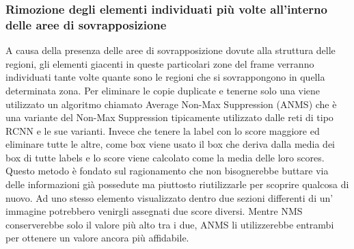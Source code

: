 \subsubsection{Rimozione degli elementi individuati più volte all'interno delle aree di sovrapposizione}
A causa della presenza delle aree di sovrapposizione dovute alla struttura delle regioni, gli elementi giacenti in queste particolari zone del frame verranno individuati tante volte quante sono le regioni che si sovrappongono in quella determinata zona. Per eliminare le copie duplicate e tenerne solo una viene utilizzato un algoritmo chiamato Average Non-Max Suppression (ANMS) che è una variante del Non-Max Suppression tipicamente utilizzato dalle reti di tipo RCNN e le sue varianti. Invece che tenere la label con lo score maggiore ed eliminare tutte le altre, come box viene usato il box che deriva dalla media dei box di tutte labels e lo score viene calcolato come la media delle loro scores.
Questo metodo è fondato sul ragionamento che non bisognerebbe buttare via delle informazioni già possedute ma piuttosto riutilizzarle per scoprire qualcosa di nuovo. Ad uno stesso elemento visualizzato dentro due sezioni differenti di un' immagine potrebbero venirgli assegnati due score diversi. Mentre NMS conserverebbe solo il valore più alto tra i due, ANMS li utilizzerebbe entrambi per ottenere un valore ancora più affidabile.
